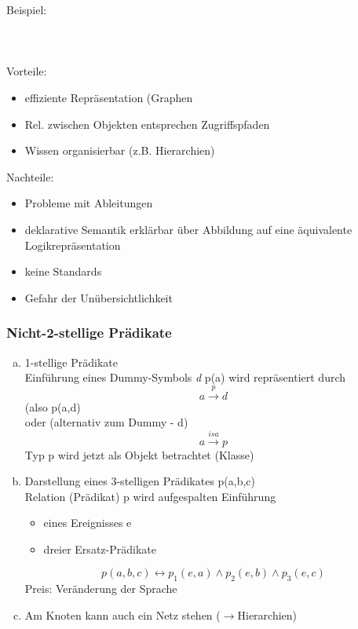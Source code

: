 \documentclass[a4paper,14pt]{article}
\begin{document}
Beispiel:\\
\\
\\
\\

Vorteile:
\begin{itemize}
 \item effiziente Repräsentation (Graphen
 \item Rel. zwischen Objekten entsprechen Zugriffspfaden
 \item Wissen organisierbar (z.B. Hierarchien)
\end{itemize}

Nachteile:
\begin{itemize}
  \item Probleme mit Ableitungen
  \item deklarative Semantik erklärbar über Abbildung auf eine äquivalente Logikrepräsentation
  \item keine Standards
  \item Gefahr der Unübersichtlichkeit
\end{itemize}
  
\subsubsection{Nicht-2-stellige Prädikate}

\begin{enumerate}[(a)]
 \item  1-stellige Prädikate\\
	Einführung eines Dummy-Symbols \emph{d}
	p(a) wird repräsentiert durch
	$$a \xrightarrow{p} d $$
	(also p(a,d)\\
	oder (alternativ zum Dummy - d)
	$$a\xrightarrow{isa}p $$
	\glqq Typ p\grqq{} wird jetzt als Objekt betrachtet (Klasse)
\item 	Darstellung eines 3-stelligen Prädikates p(a,b,c)\\
	Relation (Prädikat) p wird aufgespalten
	Einführung
	\begin{itemize}
	\item eines \glqq Ereignisses\grqq{} e
	\item dreier Ersatz-Prädikate
	\end{itemize}
	$$p(a,b,c)\leftrightarrow p_1(e,a)\wedge p_2(e,b) \wedge p_3(e,c) $$
	Preis: Veränderung der Sprache
\item	Am Knoten kann auch ein Netz stehen ($\to$Hierarchien)
\end{enumerate}
\end{document}

